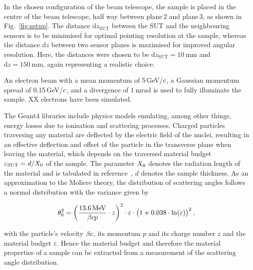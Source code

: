 \documentclass{PoS}
\newcommand{\eV}{\ensuremath{\textrm{eV}}}
\newcommand{\cspeed}{\ensuremath{\mathnormal{c}}}
\newcommand{\dz}{\ensuremath{\textrm{d}z}}
\newcommand{\dzsut}{\ensuremath{\textrm{d}z_{\textrm{SUT}}}}
\newcommand{\xzero}{\ensuremath{\mathnormal{X}_0}}
\newcommand{\Geant}{\ensuremath{\textrm{Geant4}}}
\begin{document}
In the chosen configuration of the beam telescope,
 the sample is placed in the centre of the beam telescope, half way between plane\,2 and plane\,3, as shown in Fig.~\ref{fig:setup}. %
The distance $\dzsut$ between the SUT and the neighbouring sensors is to be minimised for optimal pointing resolution at the sample,
 whereas the distance $\dz$ between two sensor planes is maximised for improved angular resolution.
Here, the distances were chosen to be $\dzsut =\SI{10}{\mm}$ and $\dz=\SI{150}{\mm}$, again representing a realistic choice. 

An electron beam with a mean momentum of 5\,GeV/$\cspeed$, a Gaussian momentum spread of 0.15\,GeV/$\cspeed$, and a divergence of $\SI{1}{\milli\radian}$ is used to fully illuminate the sample. 
XX electrons have been simulated. %

The $\Geant$ libraries include physics models emulating, among other things, energy losses due to ionisation and scattering processes.
Charged particles traversing any material are deflected by the electric field of the nuclei, resulting in an effective deflection and offset of the particle in the transverse plane when leaving the material,
 which depends on the traversed material budget $\varepsilon_{\textrm{SUT}} = d / \xzero$ of the sample. 
The parameter $\xzero$ denotes the radiation length of the material and is tabulated in reference~\cite{ref:pdg2016}, $d$ denotes the sample thickness. 
As an approximation to the Moliere theory, the distribution of scattering angles follows a normal distribution with the variance given by~\cite{ref:scatteringhighland, ref:pdg2016} 

\begin{equation}
 \theta_0^2 = \left( \frac{\SI{13.6}{\mega\eV}}{\beta \cspeed p}\cdot z \right)^2 \cdot \varepsilon \cdot \big( 1+0.038\cdot\ln(\varepsilon) \big)^2\,,
 \label{eq:highland}
\end{equation}

\noindent
with the particle's velocity $\beta \cspeed$, its momentum $p$ and its charge number $z$ and the material budget $\varepsilon$. 
Hence the material budget and therefore the material properties of a sample can be extracted from a measurement of the scattering angle distribution.

\end{document}

